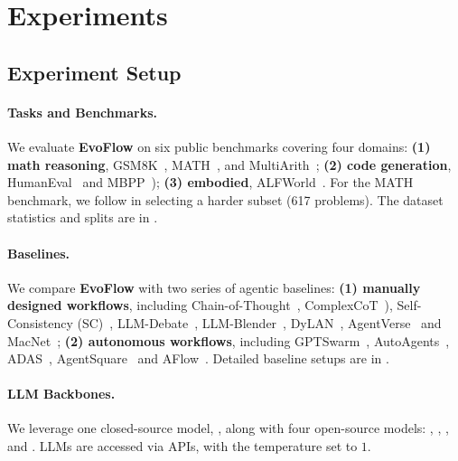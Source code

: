 \documentclass{article}
\theoremstyle{plain}
\theoremstyle{definition}
\theoremstyle{remark}
\newcommand{\ourmethod}{{\fontfamily{lmtt}\selectfont \textbf{EvoFlow}}\xspace}
\newcommand{\llmname}[1]{{\fontfamily{pcr}\selectfont {#1}}\xspace}
\begin{document}
\section{Experiments}
\vspace{-0.5em}
\subsection{Experiment Setup}\label{sec:exp-setup}
\vspace{-0.4em}
\paragraph{Tasks and Benchmarks.} We evaluate \ourmethod on six public benchmarks covering four domains: \textbf{(1) math reasoning}, GSM8K~\citep{gsm8k}, MATH~\citep{hendrycksmath2021}, and MultiArith~\cite{roy2016solving};  \textbf{(2) code generation}, HumanEval~\citep{human-eval} and MBPP~\citep{austin2021mbpp}); \textbf{(3) embodied}, ALFWorld~\citep{shridhar2021alfworld}. For the MATH benchmark, we follow \cite{hong2024datainterpreter} in selecting a harder subset (617 problems). The dataset statistics and splits are in .
\vspace{-0.8em}
\paragraph{Baselines.}  We compare \ourmethod with two series of agentic baselines: \textbf{(1) manually designed workflows}, including Chain-of-Thought~\cite{cot}, ComplexCoT~\cite{fu2022complexity}), Self-Consistency (SC)~\cite{wang2023selfconsistency},  LLM-Debate~\citep{arXiv2023_MultiAgent-Debate}, LLM-Blender~\cite{blender}, DyLAN~\citep{arXiv2023_Dynamic-LLM-Agent}, AgentVerse~\citep{chen2023agentverse} and MacNet~\citep{qian2024scaling}; \textbf{(2) autonomous workflows}, including GPTSwarm~\citep{zhuge2024gptswarm}, AutoAgents~\citep{chen2023autoagents}, ADAS~\citep{hu2024adas}, AgentSquare~\citep{shang2024agentsquare} and AFlow~\citep{zhang2024aflow}. Detailed baseline setups are in . 


\vspace{-0.8em}
\paragraph{LLM Backbones.} We leverage one closed-source model, \llmname{gpt-4o-mini-0718}, along with four open-source models: \llmname{llama-3.1-70b}, \llmname{Qwen-2-72b}, \llmname{Deepseek-V2.5}, and \llmname{Hermes-3-70b}. LLMs are accessed via APIs, with the temperature set to $1$.
\end{document}
